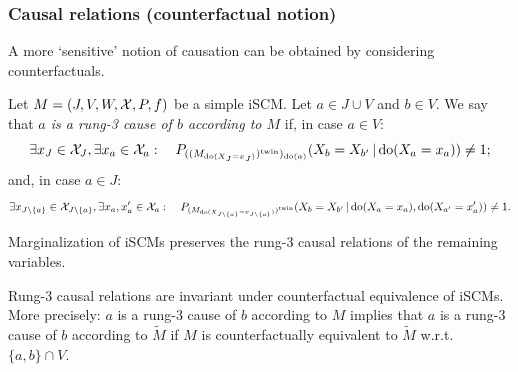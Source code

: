 \subsubsection{Causal relations (counterfactual notion)}

A more `sensitive' notion of causation can be obtained by considering counterfactuals.
\begin{Def}\label{def:scm_rung3_cause_of}
  Let $M = \left ( J, V, W, \mathcal{X}, P, f \right )$ be a simple iSCM.
  Let $a \in J \cup V$ and $b \in V$.
  We say that \emph{$a$ is a rung-3 cause of $b$ according to $M$} if, in case $a \in V$:
    $$\exists x_J \in \mathcal{X}_J, \exists x_a \in \mathcal{X}_a: \quad P_{((M_{\operatorname{do}(X_J=x_J)})^{\mathrm{twin}})_{\operatorname{do}(a)}}(X_b = X_{b'} \operatorname*{|} \operatorname{do}(X_a=x_a)) \ne 1;$$
  and, in case $a \in J$:
    $$\exists x_{J\setminus\{a\}} \in \mathcal{X}_{J\setminus\{a\}}, \exists x_a,x_a' \in \mathcal{X}_a: \quad P_{(M_{\operatorname{do}(X_{J\setminus\{a\}}=x_{J\setminus\{a\}})})^{\mathrm{twin}}}(X_b = X_{b'} \operatorname*{|} \operatorname{do}(X_a=x_a),\operatorname{do}(X_{a'}=x_a')) \ne 1.$$
\end{Def}
\begin{Rem}\label{rem:scm_rung3_cause_of_marginalization}
  Marginalization of iSCMs preserves the rung-3 causal relations of the remaining variables.
\end{Rem}
\begin{Rem}\label{rem:scm_rung3_cause_of_counterfactual_equivalence}
  Rung-3 causal relations are invariant under counterfactual equivalence of iSCMs.
  More precisely: $a$ is a rung-3 cause of $b$ according to $M$ implies that $a$ is a rung-3 cause of $b$ according to $\tilde{M}$ if $M$ is counterfactually equivalent to $\tilde{M}$ w.r.t.\ $\{a,b\} \cap V$.
\end{Rem}

